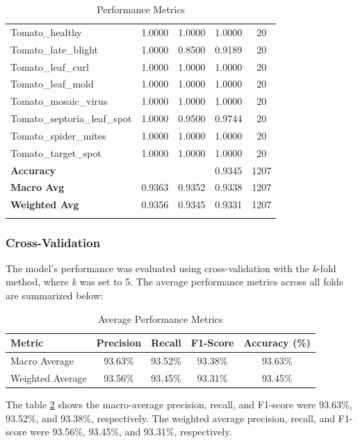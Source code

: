 \documentclass{article}
\begin{document}
\begin{center}
\begin{longtable}{lcccc}
Tomato\_healthy & 1.0000 & 1.0000 & 1.0000 & 20 \\
Tomato\_late\_blight & 1.0000 & 0.8500 & 0.9189 & 20 \\
Tomato\_leaf\_curl & 1.0000 & 1.0000 & 1.0000 & 20 \\
Tomato\_leaf\_mold & 1.0000 & 1.0000 & 1.0000 & 20 \\
Tomato\_mosaic\_virus & 1.0000 & 1.0000 & 1.0000 & 20 \\
Tomato\_septoria\_leaf\_spot & 1.0000 & 0.9500 & 0.9744 & 20 \\
Tomato\_spider\_mites & 1.0000 & 1.0000 & 1.0000 & 20 \\
Tomato\_target\_spot & 1.0000 & 1.0000 & 1.0000 & 20 \\
\hline
\textbf{Accuracy} & & & 0.9345 & 1207 \\
\textbf{Macro Avg} & 0.9363 & 0.9352 & 0.9338 & 1207 \\
\textbf{Weighted Avg} & 0.9356 & 0.9345 & 0.9331 & 1207 \\
\hline
\caption{Performance Metrics}
\label{tab:perfromance_metrics}
\end{longtable}
\end{center}

\subsubsection{Cross-Validation}
The model's performance was evaluated using cross-validation with the \textit{k}-fold method, where \textit{k} was set to 5. The average performance metrics across all folds are summarized below:

\begin{table}[!htb]
\centering
\begin{tabular}{@{}lcccc@{}}
\toprule
\textbf{Metric}         & \textbf{Precision} & \textbf{Recall} & \textbf{F1-Score} & \textbf{Accuracy (\%)} \\ \midrule
Macro Average           & 93.63\%              & 93.52\%           & 93.38\%              & 93.63\%                    \\
Weighted Average        & 93.56\%              & 93.45\%           & 93.31\%              & 93.45\%                    \\ \bottomrule
\end{tabular}
\caption{Average Performance Metrics}
\label{tab:cross-validation}
\end{table}


The table \ref{tab:cross-validation} shows the macro-average precision, recall, and F1-score were 93.63\%, 93.52\%, and 93.38\%, respectively. The weighted average precision, recall, and F1-score were 93.56\%, 93.45\%, and 93.31\%, respectively.
\end{document}
